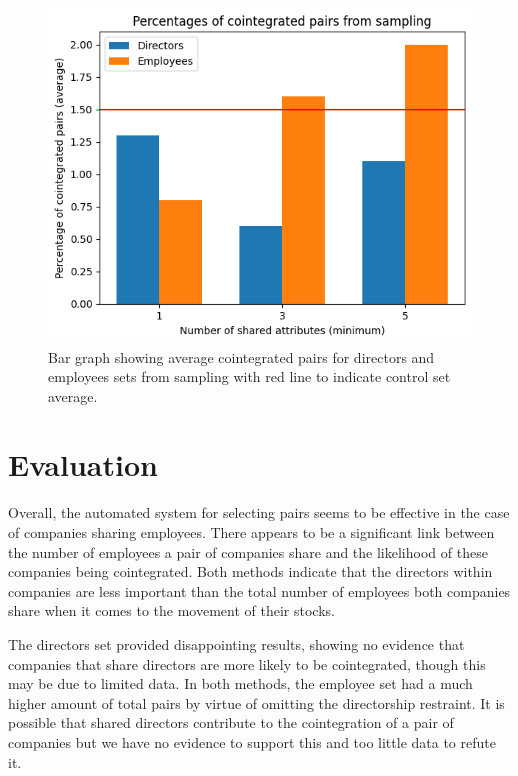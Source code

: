 \documentclass{UoYCSproject}
\begin{document}
\begin{figure}[t]
\begin{center}
\includegraphics[scale=0.7]{"./images/sampling"}
\end{center}
\caption{Bar graph showing average cointegrated pairs for directors and employees sets from sampling with red line to indicate control set average.}
\end{figure}

\section{Evaluation}

Overall, the automated system for selecting pairs seems to be effective in the case of companies sharing employees. There appears to be a significant link between the number of employees a pair of companies share and the likelihood of these companies being cointegrated. Both methods indicate that the directors within companies are less important than the total number of employees both companies share when it comes to the movement of their stocks.

The directors set provided disappointing results, showing no evidence that companies that share directors are more likely to be cointegrated, though this may be due to limited data. In both methods, the employee set had a much higher amount of total pairs by virtue of omitting the directorship restraint. It is possible that shared directors contribute to the cointegration of a pair of companies but we have no evidence to support this and too little data to refute it.
\end{document}
